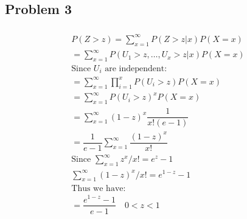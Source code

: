 \documentclass{article}
\begin{document}
\begin{flushleft}
\section*{Problem 3}
\begin{multline*}\\
P(Z>z)=\sum_{x=1}^{\infty}P(Z>z|x)P(X=x)\\
=\sum_{x=1}^{\infty}P(U_1>z,\dots,U_x>z|x)P(X=x)\\
\text{Since } U_i \text{ are independent:}\\
=\sum_{x=1}^{\infty}\prod_{i=1}^{x}P(U_i>z)P(X=x)\\
=\sum_{x=1}^{\infty}P(U_i>z)^xP(X=x)\\
=\sum_{x=1}^{\infty}(1-z)^x\dfrac{1}{x!(e-1)}\\
=\dfrac{1}{e-1}\sum_{x=1}^{\infty}\dfrac{(1-z)^x}{x!}\\
\text{Since } \sum_{x=1}^{\infty}z^x/x!=e^{z}-1\\
\sum_{x=1}^{\infty}(1-z)^x/x!=e^{1-z}-1\\
\text{Thus we have:}\\
=\dfrac{e^{1-z}-1}{e-1} \quad 0<z<1\\
\end{multline*}

\end{flushleft}
\end{document}
